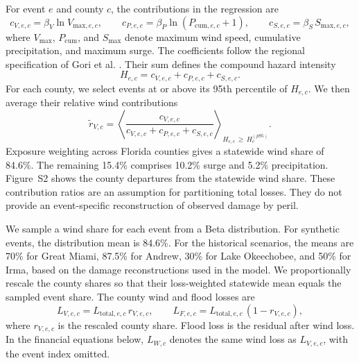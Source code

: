 For event $e$ and county $c$, the contributions in the regression are
\begin{equation}
c_{V,e,c} = \beta_V \ln V_{\text{max},e,c}, \qquad
c_{P,e,c} = \beta_P \ln\!\left(P_{\text{cum},e,c}+1\right), \qquad
c_{S,e,c} = \beta_S\, S_{\text{max},e,c},
\label{eq:hazardcontributions}
\end{equation}
where $V_{\text{max}}$, $P_{\text{cum}}$, and $S_{\text{max}}$ denote maximum wind speed, cumulative precipitation, and maximum surge. The coefficients follow the regional specification of Gori et al. \cite{gori_sensitivity_2025}. Their sum defines the compound hazard intensity
\begin{equation}
H_{e,c} = c_{V,e,c} + c_{P,e,c} + c_{S,e,c}.
\end{equation}
For each county, we select events at or above its 95th percentile of $H_{e,c}$. We then average their relative wind contributions
\begin{equation}
\tilde{r}_{V,c} =
\left\langle
\frac{c_{V,e,c}}{c_{V,e,c} + c_{P,e,c} + c_{S,e,c}}
\right\rangle_{H_{e,c}\,\geq\,H_c^{(p95)}}.
\end{equation}
Exposure weighting across Florida counties gives a statewide wind share of 84.6\%. The remaining 15.4\% comprises 10.2\% surge and 5.2\% precipitation. Figure~S2 shows the county departures from the statewide wind share. These contribution ratios are an assumption for partitioning total losses. They do not provide an event-specific reconstruction of observed damage by peril.

We sample a wind share for each event from a Beta distribution. For synthetic events, the distribution mean is 84.6\%. For the historical scenarios, the means are 70\% for Great Miami, 87.5\% for Andrew, 30\% for Lake Okeechobee, and 50\% for Irma, based on the damage reconstructions used in the model. We proportionally rescale the county shares so that their loss-weighted statewide mean equals the sampled event share. The county wind and flood losses are
\begin{equation}
L_{V,e,c}=L_{\text{total},e,c}\,r_{V,e,c}, \qquad
L_{F,e,c}=L_{\text{total},e,c}\,(1-r_{V,e,c}),
\end{equation}
where $r_{V,e,c}$ is the rescaled county share. Flood loss is the residual after wind loss. In the financial equations below, $L_{W,c}$ denotes the same wind loss as $L_{V,e,c}$, with the event index omitted.

